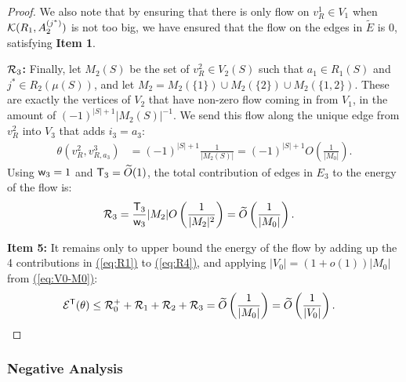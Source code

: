 \documentclass{theoretics}
\newcommand{\eq}[1]{\hyperref[eq:#1]{(\ref*{eq:#1})}}
\renewcommand{\>}{\rangle}
\newcommand{\<}{\langle}
\renewcommand{\(}{\left(}
\renewcommand{\)}{\right)}
\def\w{{\sf w}}
\begin{document}
\begin{proof}
We also note that by ensuring that there is only flow on $v^1_{R}\in V_1$ when ${\cal K}({R}_1,A_2^{(j^*)})$ is not too big, we have ensured that the flow on the edges in $\tilde{E}$ is 0, satisfying \textbf{Item 1}. 

\vskip7pt
\noindent\textbf{${\cal R}_3$:} Finally, let $M_2(S)$ be the set of $v^2_{R}\in V_2(S)$ such that $a_1\in R_1(S)$ and $j^*\in R_2(\mu(S))$, and let $M_2=M_2(\{1\})\cup M_2(\{2\})\cup M_2(\{1,2\})$. These are exactly the vertices of $V_2$ that have non-zero flow coming in from $V_1$, in the amount of
$(-1)^{|S|+1}{|M_2(S)|}^{-1}.$
We send this flow along the unique edge from $v^2_{R}$ into $V_3$ that adds $i_3=a_3$:
\begin{align*}
\theta(v^2_{R},v^3_{R,a_3}) &=(-1)^{|S|+1}\frac{1}{|M_2(S)|}=(-1)^{|S|+1}O\left(\frac{1}{|M_0|}\right).
\end{align*}
Using $\w_3=1$ and ${\sf T}_3=\widetilde{O}(1)$, the total contribution of edges in $E_3$ to the energy of the flow is:
\begin{equation}
\begin{split}
{\cal R}_3 &= \frac{{\sf T}_3}{\w_3}|M_2|O\left(\frac{1}{|M_2|^2}\right)
=\widetilde{O}\left(\frac{1}{|M_0|}\right).
\end{split}\label{eq:R4}
\end{equation}

\vskip5pt
\noindent\textbf{Item 5:} It remains only to upper bound the energy of the flow by adding up the 4 contributions in \eq{R1} to \eq{R4}, and applying $|V_0|=(1+o(1))|M_0|$ from \eq{V0-M0}:
\begin{align*}
{\cal E}^{\sf T}(\theta) &\leq {\cal R}_0^++{\cal R}_1+{\cal R}_2+{\cal R}_3
=\widetilde{O}\left(\frac{1}{|M_0|} \right)=\widetilde{O}\left(\frac{1}{|V_0|} \right). \qedhere
\end{align*}
\end{proof}

\subsubsection{Negative Analysis}
\end{document}
